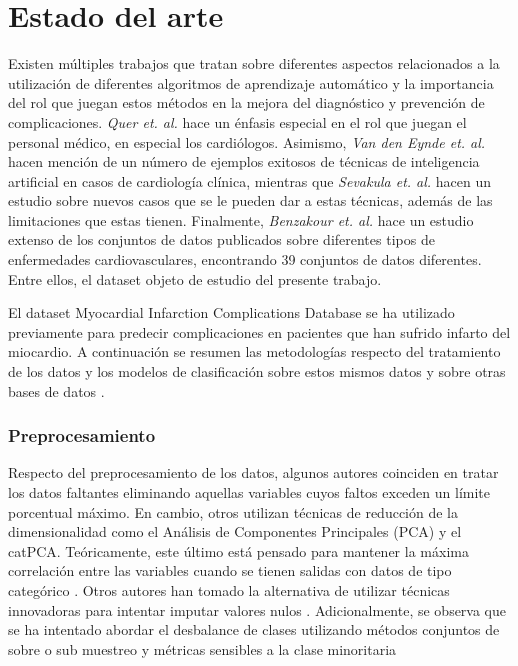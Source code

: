 \documentclass[conference]{IEEEtran}
\begin{document}
\section{Estado del arte}
Existen múltiples trabajos que tratan sobre diferentes aspectos relacionados a la utilización de diferentes algoritmos de aprendizaje automático y la importancia del rol que juegan estos métodos en la mejora del diagnóstico y prevención de complicaciones. \textit{Quer et. al.} \cite{e1} hace un énfasis especial en el rol que juegan el personal médico, en especial los cardiólogos. Asimismo, \textit{Van den Eynde et. al.} \cite{e2} hacen mención de un número de ejemplos exitosos de técnicas de inteligencia artificial en casos de cardiología clínica, mientras que \textit{Sevakula et. al.} \cite{e3} hacen un estudio sobre nuevos casos que se le pueden dar a estas técnicas, además de las limitaciones que estas tienen. Finalmente, \textit{Benzakour et. al.} \cite{zz} hace un estudio extenso de los conjuntos de datos publicados sobre diferentes tipos de enfermedades cardiovasculares, encontrando 39 conjuntos de datos diferentes. Entre ellos, el dataset objeto de estudio del presente trabajo.

El dataset Myocardial Infarction Complications Database se ha utilizado previamente para predecir complicaciones en pacientes que han sufrido infarto del miocardio. A continuación se resumen las metodologías respecto del tratamiento de los datos y los modelos de clasificación sobre estos mismos datos y sobre otras bases de datos \cite{bp}. 

\subsubsection{Preprocesamiento}
Respecto del preprocesamiento de los datos, algunos autores coinciden en tratar los datos faltantes eliminando aquellas variables cuyos faltos exceden un límite porcentual máximo. En cambio, otros utilizan técnicas de reducción de la dimensionalidad\cite{bp} como el Análisis de Componentes Principales (PCA) y el catPCA. Teóricamente, este último está pensado para mantener la máxima correlación entre las variables cuando se tienen salidas con datos de tipo categórico \cite{b1}. Otros autores han tomado la alternativa de utilizar técnicas innovadoras para intentar imputar valores nulos \cite{ll}. Adicionalmente, se observa que se ha intentado abordar el desbalance de clases utilizando métodos conjuntos de sobre o sub muestreo y métricas sensibles a la clase minoritaria \cite{by}\cite{ll}
\end{document}
